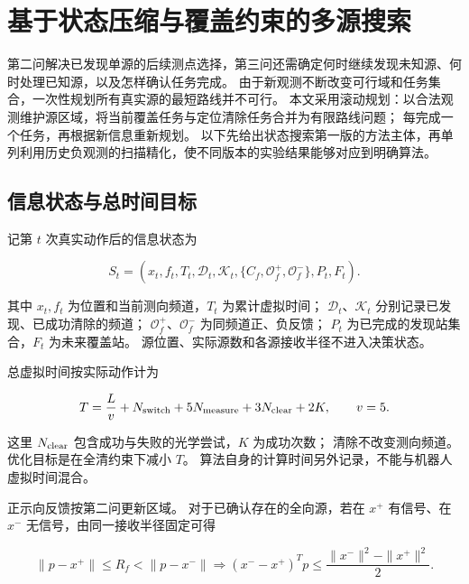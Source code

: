 \section{基于状态压缩与覆盖约束的多源搜索}\label{sec:q3}

第二问解决已发现单源的后续测点选择，第三问还需确定何时继续发现未知源、何时处理已知源，以及怎样确认任务完成。
由于新观测不断改变可行域和任务集合，一次性规划所有真实源的最短路线并不可行。
本文采用滚动规划：以合法观测维护源区域，将当前覆盖任务与定位清除任务合并为有限路线问题；
每完成一个任务，再根据新信息重新规划。
以下先给出状态搜索第一版的方法主体，再单列利用历史负观测的扫描精化，使不同版本的实验结果能够对应到明确算法。

\subsection{信息状态与总时间目标}\label{sec:q3-1}

记第 \(t\) 次真实动作后的信息状态为

\begin{equation}\label{eq:q3-1}
S_t=\left(x_t,f_t,T_t,\mathcal D_t,\mathcal K_t,
\{\widehat C_f,\mathcal O_f^+,\mathcal O_f^-\},P_t,F_t\right).
\end{equation}

其中 \(x_t,f_t\) 为位置和当前测向频道，\(T_t\) 为累计虚拟时间；
\(\mathcal D_t\)、\(\mathcal K_t\) 分别记录已发现、已成功清除的频道；
\(\mathcal O_f^+\)、\(\mathcal O_f^-\) 为同频道正、负反馈；
\(P_t\) 为已完成的发现站集合，\(F_t\) 为未来覆盖站。
源位置、实际源数和各源接收半径不进入决策状态。

总虚拟时间按实际动作计为

\begin{equation}\label{eq:q3-2}
T=\frac{L}{v}+N_{\rm switch}+5N_{\rm measure}
+3N_{\rm clear}+2K,\qquad v=5.
\end{equation}

这里 \(N_{\rm clear}\) 包含成功与失败的光学尝试，\(K\) 为成功次数；
清除不改变测向频道。
优化目标是在全清约束下减小 \(T\)。
算法自身的计算时间另外记录，不能与机器人虚拟时间混合。

正示向反馈按第二问更新区域。
对于已确认存在的全向源，若在 \(x^+\) 有信号、在 \(x^-\) 无信号，由同一接收半径固定可得

\begin{equation}\label{eq:q3-3}
\|p-x^+\|\le R_f<\|p-x^-\|
\Longrightarrow
(x^--x^+)^Tp\le\frac{\|x^-\|^2-\|x^+\|^2}{2}.
\end{equation}


